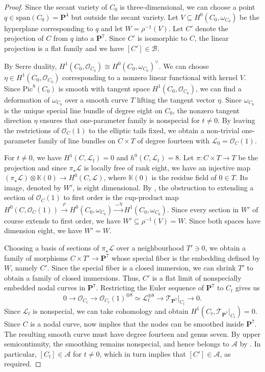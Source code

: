 \documentclass[leqno,11pt,a4paper]{amsart}
\theoremstyle{definition}
\numberwithin{equation}{section}
\newcommand{\kk}{\mathbb{K}}
\newcommand{\PP}{\mathbf{P}}
\newcommand{\OO}{\mathscr{O}}
\newcommand{\LLL}{\mathscr{L}}
\begin{document}
\begin{proof}
Since the secant variety of $C_0$ is three-dimensional, we can choose a point $q \in \mathrm{span}(C_0) = \PP^4$ but outside the secant variety. 
Let $V\subseteq H^0(C_0,\omega_{C_0})$ be the hyperplane corresponding to $q$ and let $W=\rho^{-1}(V)$.
Let $C'$ denote the projection of $C$ from $q$ into a $\PP^7$. Since $C'$ is isomorphic to $C$, the linear projection is a flat family and we have $[C'] \in \mathcal{B}$.

By Serre duality, $H^1(C_0,\OO_{C_0})\cong H^0(C_0,\omega_{C_0})^\vee$.
We can choose $\eta\in H^1(C_0,\OO_{C_0})$ corresponding to a nonzero linear functional with kernel $V$.
Since $\mathrm{Pic}^8(C_0)$ is smooth with tangent space $H^1(C_0,\OO_{C_0})$, we can find a deformation of $\omega_{C_0}$ over a smooth curve $T$ lifting the tangent vector $\eta$. Since $\omega_{C_0}$ is the unique special line bundle of degree eight on $C_0$, the nonzero tangent direction $\eta$
ensures that one-parameter family is nonspecial for $t\ne0$.
By leaving the restrictions of $\OO_C(1)$ to the elliptic tails fixed, we obtain a non-trivial one-parameter family of line bundles on $C \times T$ of degree fourteen with $\mathscr{L}_0 = \OO_C(1)$.


For $t\ne 0$, we have $H^1(C,\mathscr{L}_t)=0$ and $h^0(C,\LLL_t)=8$. 
Let $\pi:C\times T \to T$ be the projection and since $\pi_{\star} \LLL$ is locally free of rank eight, we have an injective map $(\pi_{\star}\LLL)\otimes \kk(0) \to H^0(C,\LLL)$, where $\kk(0)$ is the residue field of $0 \in T$.
Its image, denoted by $W'$, is eight dimensional. By \cite[Proposition 3.3.4]{Sernesi__Deformations}, the obstruction to extending a section of $\OO_C(1)$ to first order
is the cup-product map
$
H^0(C,\OO_C(1))\xrightarrow{\rho}H^0(C_0,\omega_{C_0})
\xrightarrow{\smile\eta}H^1(C_0,\omega_{C_0}).
$
Since every section in $W'$ of course extends to first order, we have  $W'\subseteq\rho^{-1}(V)=W$. Since both spaces have dimension eight, we have $W'=W$.

Choosing a basis of sections of $\pi_\star \mathscr{L}$ over a neighbourhood $T' \ni 0$, we obtain a family of morphisms $C\times T' \to\PP^7$ whose special fiber is the embedding defined by $W$, namely $C'$.
Since the special fiber is a closed immersion, we can shrink $T'$ to obtain a family of closed immersions.
Thus, $C'$ is a flat limit of nonspecially embedded nodal curves in $\PP^7$.
Restricting the Euler sequence of $\PP^7$ to $C_t$ gives us
$$
0 \to \OO_{C_t} \to \OO_{C_t}(1)^{\oplus 8} \simeq \LLL_t^{\oplus 8} \to \mathscr{T}_{\PP^7}|_{C_t} \to 0.
$$
Since $\LLL_t$ is nonspecial, we can take cohomology and obtain $H^1(C_t,\mathscr{T}_{\PP^7}|_{C_t})=0$.
Since $C$ is a nodal curve, \cite[Lemma 2.2]{HRS04} now implies that the nodes can be smoothed
inside $\PP^7$.
The resulting smooth curve must have degree fourteen and genus seven.
By upper semicontinuity, the smoothing remains nonspecial, and hence belongs to $\mathcal{A}$ by .
In particular, $[C_t] \in \mathcal{A}$ for $t \ne 0$, which in turn implies that $[C'] \in \mathcal{A}$, as required.
\end{proof}
\end{document}
